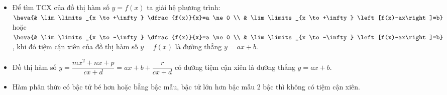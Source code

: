 \begin{nx}\quad
    \begin{itemize}
        \item Để tìm TCX của đồ thị hàm số $y=f(x)$ ta giải hệ phương trình: $\heva{& \lim \limits_{x \to +\infty} \dfrac{f(x)}{x}=a \ne 0 \\ & \lim \limits_{x \to +\infty} \left[f(x)-ax\right]=b}$ hoặc $\heva{& \lim \limits_{x \to -\infty} \dfrac{f(x)}{x}=a \ne 0 \\ & \lim \limits_{x \to -\infty} \left[f(x)-ax\right]=b}$, khi đó tiệm cận xiên của đồ thị hàm số $y=f(x)$ là đường thẳng $y=ax+b$.
        \item Đồ thị hàm số $y=\dfrac{mx^2+nx+p}{cx+d}=ax+b+\dfrac{r}{cx+d}$ có đường tiệm cận xiên là đường thẳng $y=ax+b$.
        \item Hàm phân thức có bậc tử bé hơn hoặc bằng bậc mẫu, bậc tử lớn hơn bậc mẫu 2 bậc thì không có tiệm cận xiên.
    \end{itemize}
\end{nx}